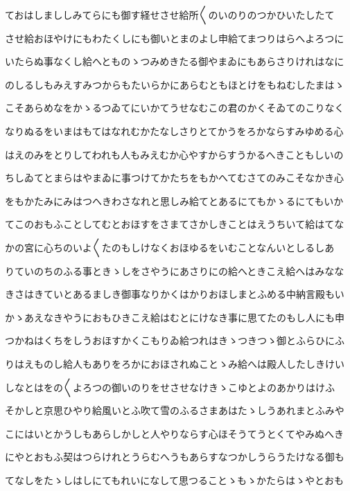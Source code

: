 \documentclass[a4paper,11pt,landscape]{ltjtarticle}
\begin{document}
\par\medskip
ておはしまししみてらにも御す経せさせ給所〱のいのりのつかひいたしたて
\par\medskip
させ給おほやけにもわたくしにも御いとまのよし申給てまつりはらへよろつに
\par\medskip
いたらぬ事なくし給へとものゝつみめきたる御やまゐにもあらさりけれはなに
\par\medskip
のしるしもみえすみつからもたいらかにあらむともほとけをもねむしたまはゝ
\par\medskip
こそあらめなをかゝるつゐてにいかてうせなむこの君のかくそゐてのこりなく
\par\medskip
なりぬるをいまはもてはなれむかたなしさりとてかうをろかならすみゆめる心
\par\medskip
はえのみをとりしてわれも人もみえむか心やすからすうかるへきこともしいの
\par\medskip
ちしゐてとまらはやまゐに事つけてかたちをもかへてむさてのみこそなかき心
\par\medskip
をもかたみにみはつへきわさなれと思しみ給てとあるにてもかゝるにてもいか
\par\medskip
てこのおもふことしてむとおほすをさまてさかしきことはえうちいて給はてな
\par\medskip
かの宮に心ちのいよ〱たのもしけなくおほゆるをいむことなんいとしるしあ
\par\medskip
りていのちのふる事ときゝしをさやうにあさりにの給へときこえ給へはみなな
\par\medskip
きさはきていとあるましき御事なりかくはかりおほしまとふめる中納言殿もい
\par\medskip
かゝあえなきやうにおもひきこえ給はむとにけなき事に思てたのもし人にも申
\par\medskip
つかねはくちをしうおほすかくこもりゐ給つれはきゝつきつゝ御とふらひにふ
\par\medskip
りはえものし給人もありをろかにおほされぬことゝみ給へは殿人したしきけい
\par\medskip
しなとはをの〱よろつの御いのりをせさせなけきゝこゆとよのあかりはけふ
\par\medskip
そかしと京思ひやり給風いとふ吹て雪のふるさまあはたゝしうあれまとふみや
\par\medskip
こにはいとかうしもあらしかしと人やりならす心ほそうてうとくてやみぬへき
\par\medskip
にやとおもふ契はつらけれとうらむへうもあらすなつかしうらうたけなる御も
\par\medskip
てなしをたゝしはしにてもれいになして思つることゝもゝかたらはゝやとおも
\par\medskip
\end{document}
